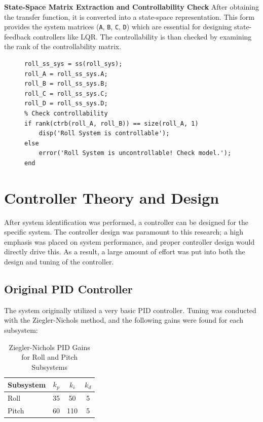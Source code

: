 \textbf{State-Space Matrix Extraction and Controllability Check}
After obtaining the transfer function, it is converted into a state-space representation. This form provides the system matrices (\texttt{A}, \texttt{B}, \texttt{C}, \texttt{D}) which are essential for designing state-feedback controllers like LQR. The controllability is than checked by examining the rank of the controllability matrix.

\begin{figure}[h!]
\centering
\begin{lstlisting}[caption={Roll State-Space Extraction and Controllability Check}, label={lst:roll_statespace_controllability}]
% Convert to state-space
roll_ss_sys = ss(roll_sys);
roll_A = roll_ss_sys.A;
roll_B = roll_ss_sys.B;
roll_C = roll_ss_sys.C;
roll_D = roll_ss_sys.D;
% Check controllability
if rank(ctrb(roll_A, roll_B)) == size(roll_A, 1)
    disp('Roll System is controllable');
else
    error('Roll System is uncontrollable! Check model.');
end
\end{lstlisting}
\end{figure}
\section{Controller Theory and Design}

After system identification was performed, a controller can be designed for the specific system. The controller design was paramount to this research; a high emphasis was placed on system performance, and proper controller design would directly drive this. As a result, a large amount of effort was put into both the design and tuning of the controller.

\subsection{Original PID Controller}

The system originally utilized a very basic PID controller. Tuning was conducted with the Ziegler-Nichols method, and the following gains were found for each subsystem:

\begin{table}[htbp]
    \centering
    \caption{Ziegler-Nichols PID Gains for Roll and Pitch Subsystems}
    \label{tab:pid_gains}
    \begin{tabular}{l c c c}
        \toprule
        \textbf{Subsystem} & \textbf{$k_p$} & \textbf{$k_i$} & \textbf{$k_d$} \\
        \midrule
        Roll               & 35             & 50             & 5              \\
        Pitch              & 60             & 110            & 5              \\
        \bottomrule
    \end{tabular}
\end{table}

